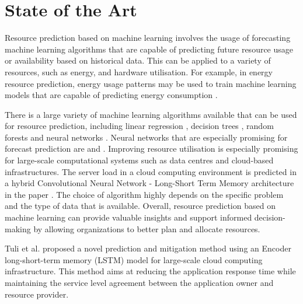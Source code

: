 \chapter{State of the Art}
\label{ch:state-of-the-art}
    
    
        Resource prediction based on machine learning involves the usage of forecasting machine learning algorithms that are capable of predicting future resource usage or availability based on historical data.
        This can be applied to a variety of resources, such as energy, and hardware utilisation.
        For example, in energy resource prediction, energy usage patterns may be used to train machine learning models that are capable of predicting energy consumption \cite{shapiEnergyConsumptionPrediction2021} \cite{richDeepMindAIReduces2016}.

        There is a large variety of machine learning algorithms available that can be used for resource prediction, including linear regression \cite{weisbergAppliedLinearRegression2005}, decision trees \cite{kotsiantisDecisionTreesRecent2013}, random forests \cite{breimanRandomForests2001} and neural networks \cite{andersonIntroductionNeuralNetworks1995}.
        Neural networks that are especially promising for forecast prediction are  and .
        Improving resource utilisation is especially promising for large-scale computational systems such as data centres and cloud-based infrastructures. 
        The server load in a cloud computing environment is predicted in a hybrid Convolutional Neural Network - Long-Short Term Memory architecture in the paper \cite{patelHybridCNNLSTMModel2022}.
        The choice of algorithm highly depends on the specific problem and the type of data that is available.
        Overall, resource prediction based on machine learning can provide valuable insights and support informed decision-making by allowing organizations to better plan and allocate resources.

        Tuli et al. \cite{tuliStartStragglerPrediction2021} proposed a novel prediction and mitigation method using an Encoder long-short-term memory (LSTM) model for large-scale cloud computing infrastructure. This method aims at reducing the application response time while maintaining the service level agreement between the application owner and resource provider.
        
